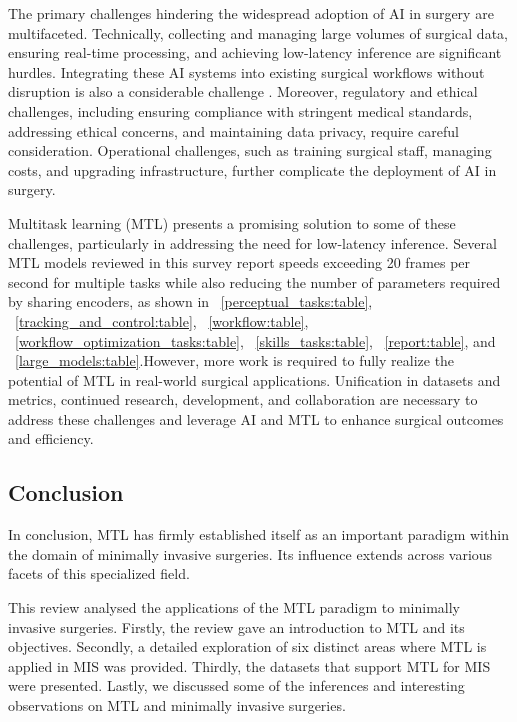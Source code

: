 \documentclass[times,twocolumn,final]{elsarticle}
\newcommand{\tabref}[1]{\tablename~\ref{#1}}
\begin{document}
The primary challenges hindering the widespread adoption of AI in surgery are multifaceted. Technically, collecting and managing large volumes of surgical data, ensuring real-time processing, and achieving low-latency inference are significant hurdles. Integrating these AI systems into existing surgical workflows without disruption is also a considerable challenge \citep{auloge2020augmented}. Moreover, regulatory and ethical challenges, including ensuring compliance with stringent medical standards, addressing ethical concerns, and maintaining data privacy, require careful consideration. Operational challenges, such as training surgical staff, managing costs, and upgrading infrastructure, further complicate the deployment of AI in surgery.

Multitask learning (MTL) presents a promising solution to some of these challenges, particularly in addressing the need for low-latency inference. Several MTL models reviewed in this survey report speeds exceeding 20 frames per second for multiple tasks while also reducing the number of parameters required by sharing encoders, as shown in \tabref{perceptual_tasks:table}, \tabref{tracking_and_control:table}, \tabref{workflow:table}, \tabref{workflow_optimization_tasks:table}, \tabref{skills_tasks:table}, \tabref{report:table}, and \tabref{large_models:table}.However, more work is required to fully realize the potential of MTL in real-world surgical applications. Unification in datasets and metrics, continued research, development, and collaboration are necessary to address these challenges and leverage AI and MTL to enhance surgical outcomes and efficiency.

\subsection{Conclusion}
In conclusion, MTL has firmly established itself as an important paradigm within the domain of minimally invasive surgeries. Its influence extends across various facets of this specialized field. 

This review analysed the applications of the MTL paradigm to minimally invasive surgeries. Firstly, the review gave an introduction to MTL and its objectives. Secondly, a detailed exploration of six distinct areas where MTL is applied in MIS was provided. Thirdly, the datasets that support MTL for MIS were presented. Lastly, we discussed some of the inferences and interesting observations on MTL and minimally invasive surgeries.
\end{document}
